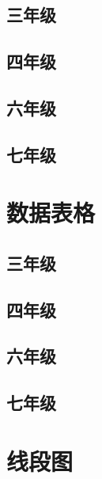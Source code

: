 \section*{三年级}


\section*{四年级}


\section*{六年级}


\section*{七年级}


\chapter{数据表格}

\section*{三年级}


\section*{四年级}


\section*{六年级}


\section*{七年级}


\chapter{线段图}

